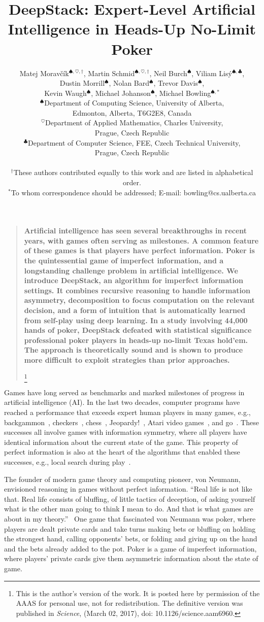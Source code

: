 \documentclass[12pt]{article}
\title{DeepStack: Expert-Level Artificial Intelligence in Heads-Up No-Limit Poker}
\author{
Matej Morav\v{c}\'{i}k$^{\spadesuit,\heartsuit,\dag}$, Martin Schmid$^{\spadesuit,\heartsuit,\dag}$, 
Neil Burch$^\spadesuit$, Viliam Lis\'y$^{\spadesuit,\clubsuit}$, \\
Dustin Morrill$^\spadesuit$, Nolan Bard$^\spadesuit$, Trevor Davis$^\spadesuit$, \\
Kevin Waugh$^\spadesuit$, Michael Johanson$^\spadesuit$, Michael Bowling$^{\spadesuit,\ast}$ \\
\normalsize{$^{\spadesuit}$Department of Computing Science, University of Alberta,}\\
\normalsize{Edmonton, Alberta, T6G2E8, Canada}\\
\normalsize{$^{\heartsuit}$Department of Applied Mathematics, Charles University,}\\
\normalsize{Prague, Czech Republic}\\
\normalsize{$^{\clubsuit}$Department of Computer Science, FEE, Czech Technical University,}\\
\normalsize{Prague, Czech Republic}\\
\\
\normalsize{$^\dag$These authors contributed equally to this work and are listed in alphabetical order.}
\\
\normalsize{$^\ast$To whom correspondence should be addressed; E-mail:  bowling@cs.ualberta.ca}
}
\date{}
\newif\iffinal
\newenvironment{sciabstract}{%
\begin{quote} \bf}
{\end{quote}}
\begin{document}
 
\maketitle 

\begin{sciabstract}
Artificial intelligence has seen several breakthroughs in recent years, with games often serving as milestones.  A common feature of these games is that players have perfect information.  Poker is the quintessential game of imperfect information, and a longstanding challenge problem in artificial intelligence.  We introduce DeepStack, an algorithm for imperfect information settings. It combines recursive reasoning to handle information asymmetry, decomposition to focus computation on the relevant decision, and a form of intuition that is automatically learned from self-play using deep learning.  In a study involving 44,000 hands of poker, DeepStack defeated with statistical significance professional poker players in heads-up no-limit Texas hold'em.  
The approach is theoretically sound and is shown to produce more difficult to exploit strategies than prior approaches.
\iffinal\else
\footnote{This is the author's version of the work. It is posted here by permission of the AAAS for personal use, not for redistribution. The definitive version was published in {\em Science}, (March 02, 2017), doi: 10.1126/science.aam6960.}
\fi
\end{sciabstract}

Games have long served as benchmarks and marked milestones of progress in artificial intelligence (AI).  
In the last two decades, computer programs have reached a performance that exceeds expert human players in many games, e.g., backgammon~\cite{Tesauro95}, checkers~\cite{SchaefferEtAl96}, chess~\cite{CampbellEtAl02}, Jeopardy!~\cite{Ferucci12}, Atari video games~\cite{Mnih15:DQN}, and go~\cite{Silver16:AlphaGo}.
These successes all involve games with information symmetry, where all players have identical information about the current state of the game.
This property of perfect information is also at the heart of the algorithms that enabled these successes, e.g., local search during play~\cite{Samuel:AlphaBeta,Kocsis06:UCT}.

The founder of modern game theory and computing pioneer, von Neumann, envisioned reasoning in games without perfect information. ``Real life is not like that.  Real life consists of bluffing, of little tactics of deception, of asking yourself what is the other man going to think I mean to do.  And that is what games are about in my theory.''~\cite{Bronowski73}
One game that fascinated von Neumann was poker, where players are dealt private cards and take turns making bets or bluffing on holding the strongest hand, calling opponents' bets, or folding and giving up on the hand and the bets already added to the pot.
Poker is a game of imperfect information, where players' private cards give them asymmetric information about the state of game.
\end{document}
